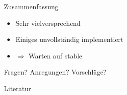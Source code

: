 \documentclass[hyperref={xetex}]{beamer}
\begin{document}
\begin{frame}{Zusammenfassung}
\begin{itemize}
	\item Sehr vielversprechend
	\item Einiges unvollst\"andig implementiert 
	\item $\Rightarrow$ Warten auf stable
\end{itemize}
	\begin{center}
	\large Fragen? Anregungen? Vorschl\"age? 
	\end{center}
\end{frame}

	

\begin{frame}{Literatur}
	
		
\end{frame}
\end{document}
